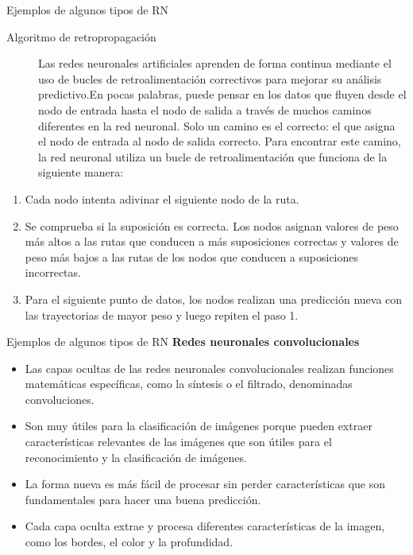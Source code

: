 \documentclass[11pt,aspectratio=169]{beamer}
\begin{document}
\begin{frame}{Ejemplos de algunos tipos de RN}
	\begin{description}
		\item[Algoritmo de retropropagación] Las redes neuronales artificiales aprenden de forma continua mediante el uso de bucles de 
			retroalimentación correctivos para mejorar su análisis predictivo.\pause En pocas palabras, puede pensar en los datos que 
			fluyen desde el nodo de entrada hasta el nodo de salida a través de muchos caminos diferentes en la red neuronal. \pause 
			Solo un camino es el correcto: el que asigna el nodo de entrada al nodo de salida correcto.\pause  
			Para encontrar este camino, la red neuronal utiliza un bucle de retroalimentación que funciona de la siguiente manera:\pause
	\end{description}
	\begin{enumerate}
		\item Cada nodo intenta adivinar el siguiente nodo de la ruta. \pause
		\item Se comprueba si la suposición es correcta. Los nodos asignan valores de peso más altos a las rutas que conducen a más 
			suposiciones correctas y valores de peso más bajos a las rutas de los nodos que conducen a suposiciones incorrectas.\pause
		\item Para el siguiente punto de datos, los nodos realizan una predicción nueva con las trayectorias de mayor peso y 
			luego repiten el paso 1.	
	\end{enumerate}
\end{frame}

\begin{frame}{Ejemplos de algunos tipos de RN}
	\textbf{Redes neuronales convolucionales}\pause
	\begin{itemize}
		\item Las capas ocultas de las redes neuronales convolucionales realizan funciones matemáticas específicas, 
			como la síntesis o el filtrado, denominadas convoluciones.\pause
		\item Son muy útiles para la clasificación de imágenes porque pueden extraer características relevantes de 
			las imágenes que son útiles para el reconocimiento y la clasificación de imágenes. \pause
		\item La forma nueva es más fácil de procesar sin perder características que son fundamentales para hacer 
			una buena predicción.\pause 
		\item Cada capa oculta extrae y procesa diferentes características de la imagen, como los bordes, el color 
			y la profundidad.
	\end{itemize}
\end{frame}
\end{document}
